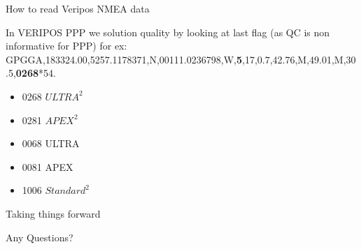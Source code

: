 \documentclass[12pt]{beamer}
\begin{document}
\begin{frame}{How to read Veripos NMEA data}
	
	In VERIPOS PPP we solution quality by looking at last flag (as QC is non informative for PPP) for ex:\\
	
\tiny{GPGGA,183324.00,5257.1178371,N,00111.0236798,W,\textbf{5},17,0.7,42.76,M,49.01,M,30.5,\textbf{0268}*54}.
	
	\begin{itemize}
		\item 0268	$ULTRA^2$
		\item 0281	$APEX^2$
		\item 0068	ULTRA
		\item 0081	APEX
		\item 1006	$Standard^2$
	\end{itemize}
	
\end{frame}



\begin{frame}{Taking things forward}
\begin{Large} %
	Any Questions?
\end{Large}
\end{frame}
\end{document}
